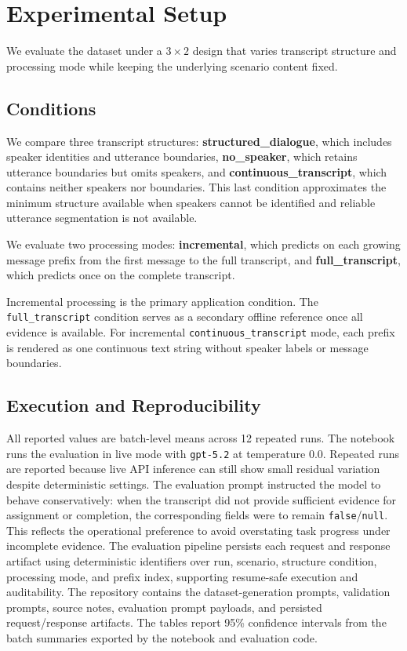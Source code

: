 \section{Experimental Setup}
\label{sec:experimental-setup}

We evaluate the dataset under a $3 \times 2$ design that varies transcript structure and processing mode while keeping the underlying scenario content fixed.

\subsection{Conditions}

We compare three transcript structures: \textbf{structured\_dialogue}, which includes speaker identities and utterance boundaries, \textbf{no\_speaker}, which retains utterance boundaries but omits speakers, and \textbf{continuous\_transcript}, which contains neither speakers nor boundaries. This last condition approximates the minimum structure available when speakers cannot be identified and reliable utterance segmentation is not available.

We evaluate two processing modes: \textbf{incremental}, which predicts on each growing message prefix from the first message to the full transcript, and \textbf{full\_transcript}, which predicts once on the complete transcript.

Incremental processing is the primary application condition. The \texttt{full\_transcript} condition serves as a secondary offline reference once all evidence is available. For incremental \texttt{continuous\_transcript} mode, each prefix is rendered as one continuous text string without speaker labels or message boundaries.

\subsection{Execution and Reproducibility}

All reported values are batch-level means across 12 repeated runs. The notebook runs the evaluation in live mode with \texttt{gpt-5.2} at temperature 0.0. Repeated runs are reported because live API inference can still show small residual variation despite deterministic settings. The evaluation prompt instructed the model to behave conservatively: when the transcript did not provide sufficient evidence for assignment or completion, the corresponding fields were to remain \texttt{false}/\texttt{null}. This reflects the operational preference to avoid overstating task progress under incomplete evidence. The evaluation pipeline persists each request and response artifact using deterministic identifiers over run, scenario, structure condition, processing mode, and prefix index, supporting resume-safe execution and auditability. The repository contains the dataset-generation prompts, validation prompts, source notes, evaluation prompt payloads, and persisted request/response artifacts. The tables report 95\% confidence intervals from the batch summaries exported by the notebook and evaluation code.

